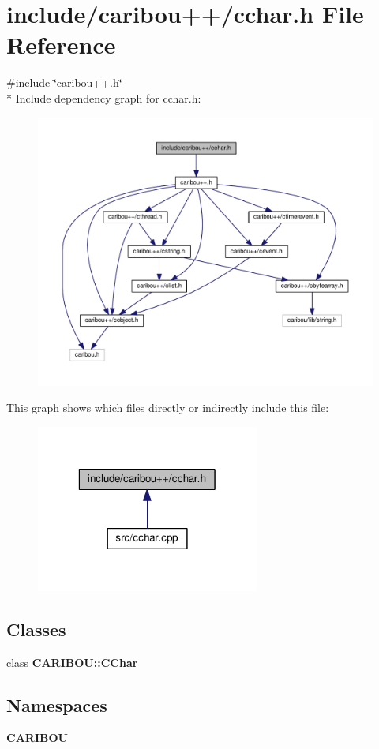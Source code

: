 \section{include/caribou++/cchar.h File Reference}
\label{cchar_8h}
{\ttfamily \#include \char`\"{}caribou++.\-h\char`\"{}}\\*
Include dependency graph for cchar.\-h\-:\nopagebreak
\begin{figure}[H]
\begin{center}
\leavevmode
\includegraphics[width=350pt]{cchar_8h__incl}
\end{center}
\end{figure}
This graph shows which files directly or indirectly include this file\-:\nopagebreak
\begin{figure}[H]
\begin{center}
\leavevmode
\includegraphics[width=208pt]{cchar_8h__dep__incl}
\end{center}
\end{figure}
\subsection*{Classes}
\begin{DoxyCompactItemize}
\item 
class {\bf C\-A\-R\-I\-B\-O\-U\-::\-C\-Char}
\end{DoxyCompactItemize}
\subsection*{Namespaces}
\begin{DoxyCompactItemize}
\item 
{\bf C\-A\-R\-I\-B\-O\-U}
\end{DoxyCompactItemize}
